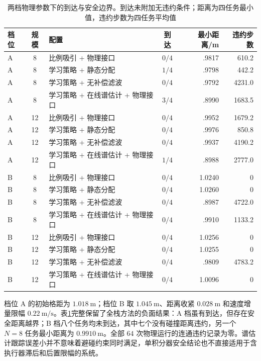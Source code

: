 \begin{table}[t]
\centering\footnotesize
\caption{两档物理参数下的到达与安全边界。到达未附加无违约条件；距离为四任务最小值，违约步数为四任务平均值}\label{tab:mujoco}
\begin{tabularx}{\textwidth}{@{}lcXcrr@{}}\toprule
档位 & 规模 & 配置 & 到达 & 最小距离/m & 违约步数\\\midrule
A & 8 & 比例吸引 + 物理接口 & $0/4$ & .9817 & 610.2\\
A & 8 & 学习策略 + 静态分配 & $1/4$ & .9798 & 442.2\\
A & 8 & 学习策略 + 无补偿滤波 & $0/4$ & .9792 & 4231.0\\
A & 8 & 学习策略 + 在线谱估计 + 物理接口 & $3/4$ & .8990 & 1683.5\\
A & 12 & 比例吸引 + 物理接口 & $0/4$ & .9952 & 1679.2\\
A & 12 & 学习策略 + 静态分配 & $0/4$ & .9976 & 850.8\\
A & 12 & 学习策略 + 无补偿滤波 & $0/4$ & .9937 & 4190.2\\
A & 12 & 学习策略 + 在线谱估计 + 物理接口 & $1/4$ & .8988 & 2777.0\\\midrule
B & 8 & 比例吸引 + 物理接口 & $0/4$ & 1.0240 & 0\\
B & 8 & 学习策略 + 静态分配 & $0/4$ & 1.0260 & 0\\
B & 8 & 学习策略 + 无补偿滤波 & $0/4$ & .8987 & 4722.0\\
B & 8 & 学习策略 + 在线谱估计 + 物理接口 & $0/4$ & .9910 & 1133.2\\
B & 12 & 比例吸引 + 物理接口 & $0/4$ & 1.0256 & 0\\
B & 12 & 学习策略 + 静态分配 & $0/4$ & 1.0255 & 0\\
B & 12 & 学习策略 + 无补偿滤波 & $0/4$ & .9809 & 4783.2\\
B & 12 & 学习策略 + 在线谱估计 + 物理接口 & $0/4$ & 1.0096 & 0\\\bottomrule
\end{tabularx}
\end{table}

档位 A 的初始格距为 $1.018\ \mathrm m$；档位 B 取 $1.045\ \mathrm m$、距离收紧 $0.028\ \mathrm m$ 和速度增量限幅 $0.22\ \mathrm{m/s}$。表\ref{tab:mujoco}完整保留了全栈方法的负面结果：A 档虽有到达，但存在安全距离越界；B 档八个任务均未到达，其中七个没有碰撞距离违约，另一个 $N=8$ 任务最小距离为 $0.9910\ \mathrm m$。全部 $64$ 次物理运行的连通违约记录为零。谱估计跟踪误差小并不意味着避碰约束同时满足，单积分器安全结论也不直接适用于含执行器滞后和后置限幅的系统。


